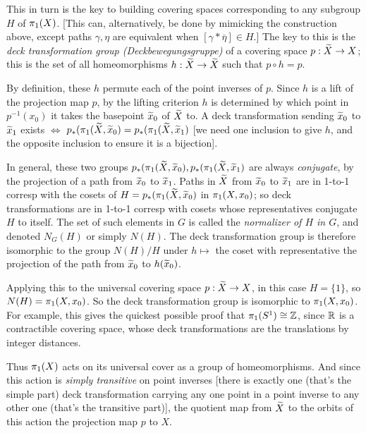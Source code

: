 \documentclass[12pt]{article}
\begin{document}
\msk

This in turn is the key to building covering spaces corresponding to any subgroup $H$ of 
$\pi_1(X)$. [This can, alternatively, be done by mimicking the construction above, 
except paths $\gamma,\eta$ are equivalent when $[\gamma*\overline{\eta}]\in H$.]
The key to this is the {\it deck transformation group
(Deckbewegungsgruppe)}
of a covering space $p:\widetilde{X}\rightarrow X$; this is the set of all
homeomorphisms $h:\widetilde{X}\rightarrow\widetilde{X}$ such that $p\circ h = p$.

By definition, these $h$ permute each of the point inverses
of $p$. Since $h$ is a lift of the projection map
$p$, by the lifting criterion $h$ is determined by which point in $p^{-1}(x_0)$ 
it takes the basepoint 
$\widetilde{x}_0$ of $\widetilde{X}$ to. A deck transformation sending
$\widetilde{x}_0$ to $\widetilde{x}_1$ exists $\Leftrightarrow$
$p_*(\pi_1(\widetilde{X},\widetilde{x}_0)=p_*(\pi_1(\widetilde{X},\widetilde{x}_1)$
[we need one inclusion to give $h$, and the opposite inclusion
to ensure it is a bijection]. 

In general, these two groups $p_*(\pi_1(\widetilde{X},\widetilde{x}_0),p_*(\pi_1(\widetilde{X},\widetilde{x}_1)$
are always {\it conjugate}, by the projection of a path from 
$\widetilde{x}_0$ to $\widetilde{x}_1$.
Paths in $\widetilde{X}$ from $\widetilde{x}_0$ to $\widetilde{x}_1$ are in 1-to-1
corresp with the cosets of $H=p_*(\pi_1(\widetilde{X},\widetilde{x}_0)$ in 
$\pi_1({X},{x}_0)$; so deck transformations are in 1-to-1 
corresp with cosets whose representatives conjugate 
$H$ to itself. The set of such elements in $G$ is called the 
{\it normalizer of $H$ in $G$}, and denoted $N_G(H)$ or simply
$N(H)$. The deck transformation group is therefore
isomorphic to the group $N(H)/H$ under
$h\mapsto$ the coset with representative the projection of the path from 
$\widetilde{x}_0$ to $h(\widetilde{x}_0)$. 

\ssk

Applying this to the universal covering space
$p:\widetilde{X}\rightarrow X$, in this case $H=\{1\}$, so $N(H)=\pi_1(X,x_0)$.
So the deck transformation group is isomorphic to $\pi_1(X,x_0)$. 
For example, this gives the quickest possible proof 
that $\pi_1(S^1)\cong {\mathbb Z}$, since ${\mathbb R}$ is a 
contractible covering space, whose deck transformations
are the translations by integer distances. 

Thus $\pi_1(X)$ acts on its universal cover as a group of
homeomorphisms. And since this action is {\it simply transitive}
on point inverses [there is exactly one (that's the simple
part) deck transformation carrying any one point in a point 
inverse to any other one (that's the transitive part)], the 
quotient map from $\widetilde{X}$ to the orbits of this action 
the projection map $p$ to $X$.
\end{document}
